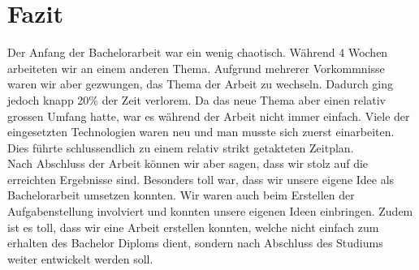 \section{Fazit}
Der Anfang der Bachelorarbeit war ein wenig chaotisch. Während 4 Wochen arbeiteten wir an einem anderen Thema. Aufgrund mehrerer Vorkommnisse waren wir aber gezwungen, das Thema der Arbeit zu wechseln. Dadurch ging jedoch knapp 20\% der Zeit verlorem. Da das neue Thema aber einen relativ grossen Umfang hatte, war es während der Arbeit nicht immer einfach. Viele der eingesetzten Technologien waren neu und man musste sich zuerst einarbeiten. Dies führte schlussendlich zu einem relativ strikt getakteten Zeitplan. \\

Nach Abschluss der Arbeit können wir aber sagen, dass wir stolz auf die erreichten Ergebnisse sind. Besonders toll war, dass wir unsere eigene Idee als Bachelorarbeit umsetzen konnten. Wir waren auch beim Erstellen der Aufgabenstellung involviert und konnten unsere eigenen Ideen einbringen. Zudem ist es toll, dass wir eine Arbeit erstellen konnten, welche nicht einfach zum erhalten des Bachelor Diploms dient, sondern nach Abschluss des Studiums weiter entwickelt werden soll.